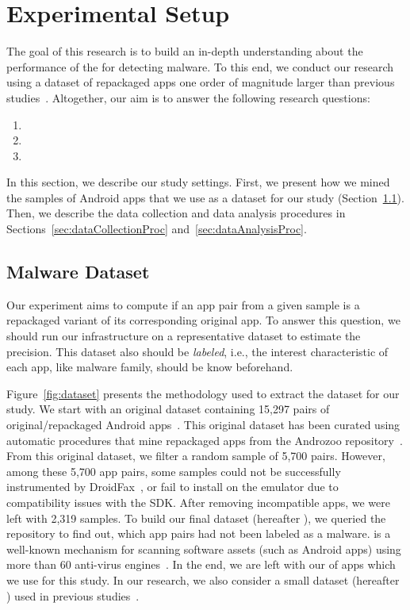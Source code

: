 \section{Experimental Setup}\label{sec:experimentalSetup}

The goal of this research is to build an in-depth understanding about
the performance of the \mas for detecting malware. To this
end, we conduct our research using a dataset of repackaged apps one order of magnitude
larger than previous studies~\cite{DBLP:conf/wcre/BaoLL18,DBLP:journals/jss/CostaMMSSBNR22}. Altogether, our
aim is to answer the following research questions:

\begin{enumerate}[(RQ1)]
\item \rqa
\item \rqc
\item \rqd  
\end{enumerate}

In this section, we describe our study settings. First, we present how we mined the samples of Android apps that we
use as a dataset for our study (Section~\ref{sec:dataset}).  Then, we describe the data
collection and data analysis procedures in Sections~\ref{sec:dataCollectionProc} and~\ref{sec:dataAnalysisProc}.


\subsection{Malware Dataset}\label{sec:dataset}


Our experiment aims to compute if an app pair from a given sample is a repackaged variant of its corresponding original app. To answer this question, we should run our infrastructure on a representative dataset to estimate the \mas precision. This dataset also should be \textit{labeled}, i.e., the interest characteristic of each app, like malware family, should be know beforehand. 

Figure~\ref{fig:dataset} presents the methodology used to extract the dataset for our study. We start with an original dataset containing 15,297 pairs of original/repackaged Android apps~\cite{DBLP:journals/tse/LiBK21}. This original dataset
has been curated using automatic procedures that mine repackaged apps from the Androzoo repository~\cite{DBLP:conf/msr/AllixBKT16}. From this original dataset, we filter a random sample of 5,700 pairs. However, among these 5,700 app pairs, some samples could not be successfully instrumented by DroidFax~\cite{DBLP:conf/icsm/CaiR17a}, or fail to install on the emulator due to compatibility issues with the SDK. After removing incompatible apps, we were left with 2,319 samples. To build our final dataset (hereafter \cds), we queried the \vt repository to find out, which app pairs had not been labeled as a malware. \vt is a well-known mechanism for scanning software assets (such as Android apps) using more than 60 anti-virus engines~\cite{DBLP:journals/ese/KhanmohammadiEH19}. In the end, we are left with our \cds of \apps apps which we use for this study. In our research, we also consider a small dataset (hereafter \sds) used in previous studies~\cite{DBLP:conf/wcre/BaoLL18,DBLP:journals/jss/CostaMMSSBNR22}.

